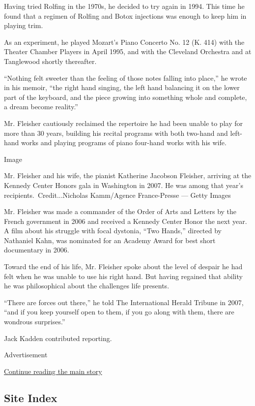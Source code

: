 Having tried Rolfing in the 1970s, he decided to try again in 1994. This
time he found that a regimen of Rolfing and Botox injections was enough
to keep him in playing trim.

As an experiment, he played Mozart's Piano Concerto No. 12 (K. 414) with
the Theater Chamber Players in April 1995, and with the Cleveland
Orchestra and at Tanglewood shortly thereafter.

``Nothing felt sweeter than the feeling of those notes falling into
place,'' he wrote in his memoir, ``the right hand singing, the left hand
balancing it on the lower part of the keyboard, and the piece growing
into something whole and complete, a dream become reality.''

Mr. Fleisher cautiously reclaimed the repertoire he had been unable to
play for more than 30 years, building his recital programs with both
two-hand and left-hand works and playing programs of piano four-hand
works with his wife.

Image

Mr. Fleisher and his wife, the pianist Katherine Jacobson Fleisher,
arriving at the Kennedy Center Honors gala in Washington in 2007. He was
among that year's recipients.~Credit...Nicholas Kamm/Agence
France-Presse --- Getty Images

Mr. Fleisher was made a commander of the Order of Arts and Letters by
the French government in 2006 and received a Kennedy Center Honor the
next year. A film about his struggle with focal dystonia, ``Two Hands,''
directed by Nathaniel Kahn, was nominated for an Academy Award for best
short documentary in 2006.

Toward the end of his life, Mr. Fleisher spoke about the level of
despair he had felt when he was unable to use his right hand. But having
regained that ability he was philosophical about the challenges life
presents.

``There are forces out there,'' he told The International Herald Tribune
in 2007, ``and if you keep yourself open to them, if you go along with
them, there are wondrous surprises.''

Jack Kadden contributed reporting.

Advertisement

\protect\hyperlink{after-bottom}{Continue reading the main story}

\hypertarget{site-index}{%
\subsection{Site Index}\label{site-index}}

